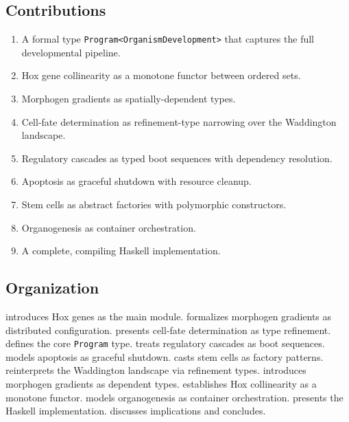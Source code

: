 \documentclass[12pt,a4paper]{article}
\newcommand{\Prog}{\texttt{Program}}
\begin{document}
\subsection{Contributions}

\begin{enumerate}[leftmargin=2em]
  \item A formal type \texttt{Program\textless{}OrganismDevelopment\textgreater{}}
    that captures the full developmental pipeline.
  \item Hox gene collinearity as a monotone functor between ordered sets.
  \item Morphogen gradients as spatially-dependent types.
  \item Cell-fate determination as refinement-type narrowing over the
    Waddington landscape.
  \item Regulatory cascades as typed boot sequences with dependency resolution.
  \item Apoptosis as graceful shutdown with resource cleanup.
  \item Stem cells as abstract factories with polymorphic constructors.
  \item Organogenesis as container orchestration.
  \item A complete, compiling Haskell implementation.
\end{enumerate}

\subsection{Organization}

 introduces Hox genes as the main module.
 formalizes morphogen gradients as distributed
configuration.   presents cell-fate determination
as type refinement.   defines the core
\Prog{} type.   treats regulatory cascades as
boot sequences.   models apoptosis as graceful
shutdown.   casts stem cells as factory patterns.
 reinterprets the Waddington landscape via
refinement types.   introduces morphogen
gradients as dependent types.   establishes
Hox collinearity as a monotone functor.  
models organogenesis as container orchestration.
 presents the Haskell implementation.
 discusses implications and concludes.
\end{document}
